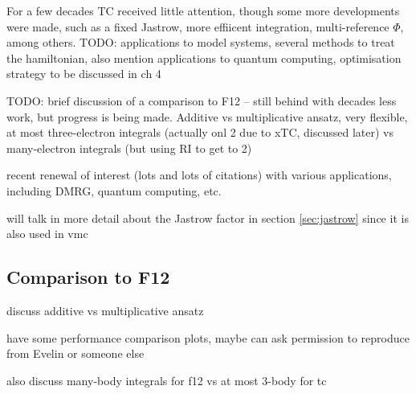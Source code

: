 For a few decades TC received little attention, though some more developments were made, such as a fixed Jastrow, more effiicent integration, multi-reference $\Phi$, among others. TODO: applications to model systems, several methods to treat the hamiltonian, also mention applications to quantum computing, optimisation strategy to be discussed in ch 4

TODO: brief discussion of a comparison to F12 -- still behind with decades less work, but progress is being made. Additive vs multiplicative ansatz, very flexible, at most three-electron integrals (actually onl 2 due to xTC, discussed later) vs many-electron integrals (but using RI to get to 2)


recent renewal of interest (lots and lots of citations) with various applications, including DMRG, quantum computing, etc.

will talk in more detail about the Jastrow factor in section \ref{sec:jastrow} since it is also used in vmc




\subsection{Comparison to F12}


discuss additive vs multiplicative ansatz

have some performance comparison plots, maybe can ask permission to reproduce from Evelin or someone else

also discuss many-body integrals for f12 vs at most 3-body for tc


